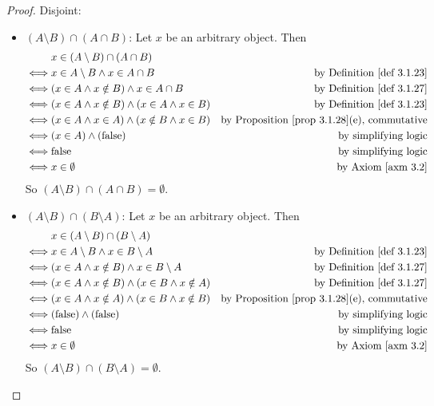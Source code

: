 \begin{proof}
Disjoint:
\begin{itemize}
    \item \((A \setminus B) \cap (A \cap B)\): Let \(x\) be an arbitrary object. Then
        \begin{align*}
             & x \in (A \setminus B) \cap (A \cap B) \\
        \iff & x \in A \setminus B \land x \in A \cap B & \text{by \DEF{3.1.23}} \\
        \iff & (x \in A \land x \notin B) \land x \in A \cap B & \text{by \DEF{3.1.27}} \\
        \iff & (x \in A \land x \notin B) \land (x \in A \land x \in B) & \text{by \DEF{3.1.23}} \\
        \iff & (x \in A \land x \in A) \land (x \notin B \land x \in B) & \text{by \PROP{3.1.28}(e), commutative} \\
        \iff & (x \in A) \land (\text{false}) & \text{by simplifying logic} \\
        \iff & \text{false} & \text{by simplifying logic} \\
        \iff & x \in \emptyset & \text{by \AXM{3.2}}
        \end{align*}
        So \((A \setminus B) \cap (A \cap B) = \emptyset\).
    \item \((A \setminus B) \cap (B \setminus A)\): Let \(x\) be an arbitrary object. Then
        \begin{align*}
             & x \in (A \setminus B) \cap (B \setminus A) \\
        \iff & x \in A \setminus B \land x \in B \setminus A & \text{by \DEF{3.1.23}} \\
        \iff & (x \in A \land x \notin B) \land x \in B \setminus A & \text{by \DEF{3.1.27}} \\
        \iff & (x \in A \land x \notin B) \land (x \in B \land x \notin A) & \text{by \DEF{3.1.27}} \\
        \iff & (x \in A \land x \notin A) \land (x \in B \land x \notin B) & \text{by \PROP{3.1.28}(e), commutative} \\
        \iff & (\text{false}) \land (\text{false}) & \text{by simplifying logic} \\
        \iff & \text{false} & \text{by simplifying logic} \\
        \iff & x \in \emptyset & \text{by \AXM{3.2}}
        \end{align*}
        So \((A \setminus B) \cap (B \setminus A) = \emptyset\).

\end{itemize}
\end{proof}
